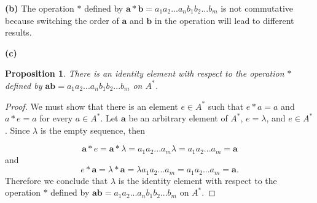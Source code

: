 \documentclass[12pt]{article}
\newtheorem*{proposition}{Proposition}  %
\begin{document}
\bigskip

\noindent\textbf{(b)} \quad The operation $*$ defined by $\textbf{a} * \textbf{b} = a_1a_2...a_nb_1b_2...b_m$ is not commutative because switching the order of $\textbf{a}$ and $\textbf{b}$ in the operation will lead to different results.

\bigskip

\noindent\textbf{(c)}
\begin{proposition}
  There is an identity element with respect to the operation $*$ defined by $\textbf{ab} = a_1a_2...a_nb_1b_2...b_m$ on $A^*$.
\end{proposition}
\begin{proof}
We must show that there is an element $ e \in A^*$ such that $e * a = a$ and $a * e = a$ for every $a \in A^*$. Let $\textbf{a}$ be an arbitrary element of $A^*$, $e = \lambda$, and $e \in A^*$. Since $\lambda$ is the empty sequence, then

\begin{equation*}
  \textbf{a} * e = \textbf{a}*\lambda = a_1a_2...a_m\lambda = a_1a_2...a_m = \textbf{a}
\end{equation*}
and
\begin{equation*}
  e * \textbf{a} = \lambda*\textbf{a} = \lambda a_1a_2...a_m = a_1a_2...a_m = \textbf{a}.
\end{equation*}
Therefore we conclude that $\lambda$ is the identity element with respect to the operation $*$ defined by $\textbf{ab} = a_1a_2...a_nb_1b_2...b_m$ on $A^*$.

\end{proof}
\end{document}
